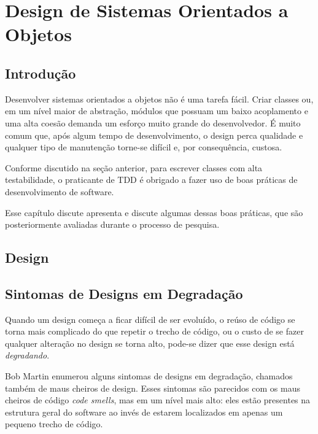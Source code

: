 \chapter{Design de Sistemas Orientados a Objetos}
\label{cap:design}

\section{Introdução}
\label{sec:design-introducao}

Desenvolver sistemas orientados a objetos não é uma tarefa fácil. Criar
classes ou, em um nível maior de abstração, módulos que possuam um baixo
acoplamento e uma alta coesão demanda um esforço muito grande do desenvolvedor. 
É muito comum que, após algum tempo de desenvolvimento, o design perca qualidade
e qualquer tipo de manutenção torne-se difícil e, por consequência, custosa.

Conforme discutido na seção anterior, para escrever classes com alta
testabilidade, o praticante de TDD é obrigado a fazer uso de boas práticas de
desenvolvimento de software. 

Esse capítulo discute apresenta e discute algumas dessas boas práticas, que
são posteriormente avaliadas durante o processo de pesquisa. 

\section{Design}

\section{Sintomas de Designs em Degradação}
\label{sec:design-degradacao}

Quando um design começa a ficar difícil de ser evoluído, o reúso de código se 
torna mais complicado do que repetir o trecho de código, ou o custo de se fazer 
qualquer alteração no design se torna alto, pode-se dizer que esse design
está \textit{degradando}. 

Bob Martin \cite{bob-martin} enumerou alguns sintomas de designs em degradação, 
chamados também de maus cheiros de design. Esses sintomas são parecidos com os 
maus cheiros de código \textit{code smells}, mas em um nível mais alto: eles
estão presentes na estrutura geral do software ao invés de estarem localizados
em apenas um pequeno trecho de código.

